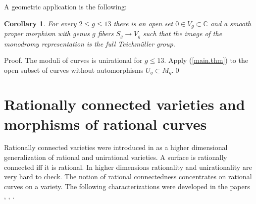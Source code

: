 \documentclass[12pt,twoside]{amsart}
\renewcommand{\c}[0]{{\mathbb C}}
\newtheorem{cor}[thm]{Corollary}
\theoremstyle{definition}
\theoremstyle{remark}
\begin{document}
\medskip

A geometric application is the following:


\begin{cor} For every $2\leq g\leq 13$ there is an open set
$0\in V_g\subset \c$ and a smooth proper morphism
with genus $g$ fibers $S_g\to V_g$ such that the
image of the  monodromy representation
is the full Teichm\"uller group.
\end{cor}

Proof. The moduli of curves is unirational for $g\leq 13$.
Apply (\ref{main.thm}) to the open subset of
curves without automorphisms  $U_g\subset M_g$.\qed



\section{Rationally connected varieties and morphisms of rational curves}

Rationally connected varieties were introduced in \cite{kmm2}
as a higher dimensional generalization of rational and unirational
varieties.
A surface is rationally connected iff it is rational.
In higher dimensions  rationality
 and unirationality are very hard to check.
The notion of rational connectedness  concentrates on
rational curves on a variety.
The following characterizations
were developed in the papers
\cite{kmm2}, \cite[IV.3]{rcbook}, \cite[4.1.2]{k-lowdeg}.
\end{document}
